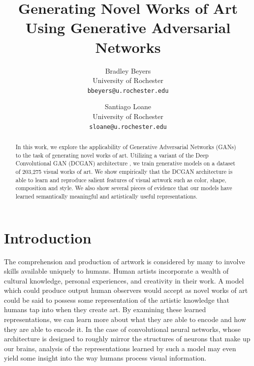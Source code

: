 \documentclass[10pt,twocolumn,letterpaper]{article}
\begin{document}
\title{Generating Novel Works of Art Using Generative Adversarial Networks}

\author{Bradley Beyers\\
	University of Rochester\\
	{\tt\small bbeyers@u.rochester.edu}
	\and
	Santiago Loane\\
	University of Rochester\\
	{\tt\small sloane@u.rochester.edu}
}


\maketitle

\begin{abstract}
   In this work, we explore the applicability of Generative Adversarial Networks (GANs)
   to the task of generating novel works of art. Utilizing a variant of the Deep Convolutional GAN (DCGAN)
   architecture \cite{radford2015unsupervised}, we train generative models on a dataset of 203,275 visual works of art. We show empirically that the DCGAN architecture is able to learn and reproduce salient features of visual artwork such as color, shape, composition and style. We also show several pieces of evidence that our models have learned semantically meaningful and artistically useful representations.
\end{abstract}

\section{Introduction}
The comprehension and production of artwork is considered by many to involve skills available
uniquely to humans. Human artists incorporate a wealth of cultural knowledge, personal experiences,
and creativity in their work. A model which could produce output human observers would accept
as novel works of art could be said to possess some representation of the artistic knowledge
that humans tap into when they create art. By examining these learned representations, we can
learn more about what they are able to encode and how they are able to encode it. In the case of convolutional neural networks, whose architecture is designed to roughly mirror the structures of neurons that make up our brains, analysis of the representations learned by such a model may even yield some insight into the way humans process visual information.
\end{document}
